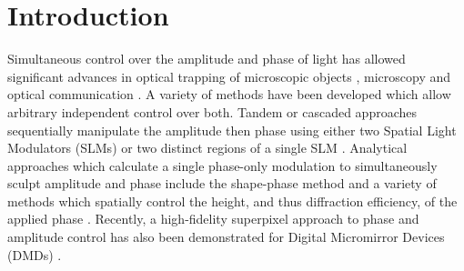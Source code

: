 \documentclass[amsmath,onecolumn,superscriptaddress,notitlepage]{revtex4-1}
\begin{document}
\maketitle




\section{Introduction}

Simultaneous control over the amplitude and phase of light has allowed significant advances in optical trapping of microscopic objects \cite{Woerdemann+13}, microscopy \cite{Maurer+11} and optical communication \cite{Willner+15}. A variety of methods have been developed which allow arbitrary independent control over both. Tandem or cascaded approaches sequentially manipulate the amplitude then phase using either two Spatial Light Modulators (SLMs) or two distinct regions of a single SLM \cite{Neto+96,Jesacher+08,Zhu+14}. Analytical approaches which calculate a single phase-only modulation to simultaneously sculpt amplitude and phase include the shape-phase method \cite{Roichman+06} and a variety of methods which spatially control the height, and thus diffraction efficiency, of the applied phase \cite{Clark+16}. Recently, a high-fidelity superpixel approach to phase and amplitude control has also been demonstrated for Digital Micromirror Devices (DMDs) \cite{Goorden+14}.
\end{document}
